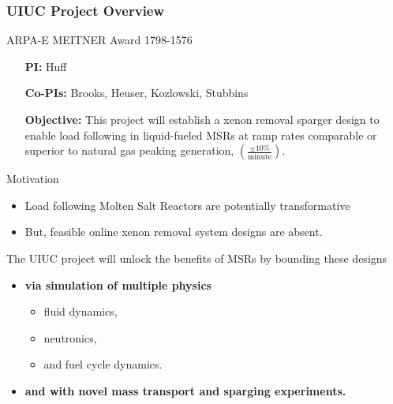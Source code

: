 \begin{frame}
\frametitle{UIUC Project Overview}
        \begin{block}{ARPA-E MEITNER Award 1798-1576}
                \begin{itemize}
                        \item[\textbf{PI:}] Huff
                        \item[\textbf{Co-PIs:}] Brooks, Heuser, Kozlowski, Stubbins
                        \item[\textbf{Objective:}] This project will establish 
                                a xenon removal sparger design to enable load 
                                following in liquid-fueled MSRs at ramp rates 
                                comparable or superior to natural gas peaking 
                                generation, $\left(\frac{\pm 
                                10\%}{\mbox{minute}}\right)$.
                \end{itemize}
        \end{block}

        \begin{block}{Motivation}
\begin{itemize}
\item Load following Molten Salt Reactors are potentially transformative
\item But, feasible online xenon removal system designs are absent.
\end{itemize} 
  The UIUC project will unlock the benefits of MSRs by bounding these designs
        \begin{itemize}
                \item \textbf{via simulation of multiple physics}
                \begin{itemize}
                        \item fluid dynamics,
                        \item neutronics,
                        \item and fuel cycle dynamics.
                \end{itemize}
                \item \textbf{and with novel mass transport and sparging experiments.}
        \end{itemize}
        \end{block}
\end{frame}

